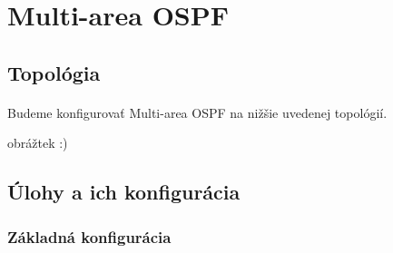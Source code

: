 \documentclass[12pt,twoside,a4paper]{article}
\begin{document}

\section*{Multi-area OSPF}
\subsection*{Topológia}
\paragraph{}
Budeme konfigurovať Multi-area OSPF na nižšie uvedenej topológií.

obrážtek :)

\subsection*{Úlohy a ich konfigurácia}
\subsubsection*{Základná konfigurácia}
\paragraph{}
\end{document}
